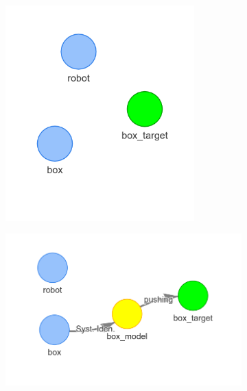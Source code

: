 \begin{figure}[H]
    \centering
    \begin{subfigure}{.3\textwidth}
    \centering
    \includegraphics[width=0.8\textwidth]{figures/connecting_nodes/robot_push/robot_push_1}
    \caption{}
    \end{subfigure}
    \begin{subfigure}{.3\textwidth}
    \centering
    \includegraphics[width=1.1\textwidth]{figures/connecting_nodes/robot_push/robot_push_2}
    \caption{}\label{subfig:robot_push_2}
    \end{subfigure}
    \begin{subfigure}{.3\textwidth}

\end{subfigure}
\end{figure}
